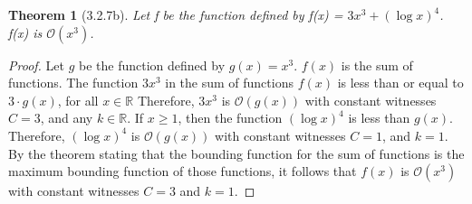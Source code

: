 \documentclass[a4paper, 12pt]{article}
\theoremstyle{plain}
\newtheorem*{theorem*}{Theorem}
\begin{document}
	
	\begin{theorem*}[3.2.7b]
		Let f be the function defined by f(x) = $3x^{3} + (\log x)^{4}$. \newline f(x) is $\mathcal{O}(x^{3})$.
	\end{theorem*}
	
	\begin{proof}
		Let $g$ be the function defined by $g(x) = x^{3}$. $f(x)$ is the sum of functions. The function $3x^{3}$ in the sum of functions $f(x)$ is less than or equal to $3 \cdot g(x)$, for all $x \in \mathbb{R}$ Therefore, $3x^{3}$ is $\mathcal{O}(g(x))$ with constant witnesses $C = 3$, and any $k \in \mathbb{R}$.
		If $x \ge 1$, then the function $(\log x)^{4}$ is less than $g(x)$. Therefore, $(\log x)^{4}$ is $\mathcal{O}(g(x))$ with constant witnesses $C = 1$, and $k = 1$. By the theorem stating that the bounding function for the sum of functions is the maximum bounding function of those functions, it follows that $f(x)$ is $\mathcal{O}(x^{3})$ with constant witnesses $C = 3$ and $k = 1$.
	\end{proof}
\end{document}
